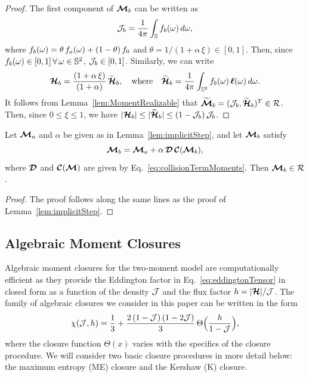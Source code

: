 \begin{proof}
  The first component of $\boldsymbol{\mathcal{M}}_{b}$ can be written as
  \begin{equation}
    \mathcal{J}_{b}=\frac{1}{4\pi}\int_{\mathbb{S}}f_{b}(\omega)\,d\omega,
  \end{equation}
  where $f_{b}(\omega)=\theta\,f_{a}(\omega)+(1-\theta)\,f_{0}$ and $\theta=1/(1+\alpha\,\xi)\in[0,1]$.  
  Then, since $f_{b}(\omega)\in[0,1]\,\forall\,\omega\in\mathbb{S}^{2}$, $\mathcal{J}_{b}\in[0,1]$.  
  Similarly, we can write
  \begin{equation*}
    \boldsymbol{\mathcal{H}}_{b}=\frac{(1+\alpha\,\xi)}{(1+\alpha)}\,\widetilde{\boldsymbol{\mathcal{H}}}_{b},
    \quad\text{where}\quad
    \widetilde{\boldsymbol{\mathcal{H}}}_{b}=\frac{1}{4\pi}\int_{\mathbb{S}^{2}}f_{b}(\omega)\,\boldsymbol{\ell}(\omega)\,d\omega.  
  \end{equation*}
  It follows from Lemma~\ref{lem:MomentRealizable} that $\widetilde{\boldsymbol{\boldsymbol{\mathcal{M}}}}_{b}=(\mathcal{J}_{b},\widetilde{\boldsymbol{\mathcal{H}}}_{b})^{T}\in\mathcal{R}$.  
  Then, since $0\le\xi\le1$, we have $|\boldsymbol{\mathcal{H}}_{b}|\le|\widetilde{\boldsymbol{\mathcal{H}}}_{b}|\le(1-\mathcal{J}_{b})\,\mathcal{J}_{b}$.  
\end{proof}

\begin{lemma}
  Let $\boldsymbol{\mathcal{M}}_{a}$ and $\alpha$ be given as in Lemma~\ref{lem:implicitStep}, and let $\boldsymbol{\mathcal{M}}_{b}$ satisfy
  \begin{equation*}
    \boldsymbol{\mathcal{M}}_{b}=\boldsymbol{\mathcal{M}}_{a}+\alpha\,\boldsymbol{\mathcal{D}}\,\boldsymbol{\mathcal{C}}(\boldsymbol{\mathcal{M}}_{b}),    
  \end{equation*}
  where $\boldsymbol{\mathcal{D}}$ and $\boldsymbol{\mathcal{C}}(\boldsymbol{\mathcal{M}})$ are given by Eq.~\eqref{eq:collisionTermMoments}.  
  Then $\boldsymbol{\mathcal{M}}_{b}\in\mathcal{R}$.  
  \label{lem:correctionStep}
\end{lemma}

\begin{proof}
  The proof follows along the same lines as the proof of Lemma~\ref{lem:implicitStep}.  
\end{proof}


\subsection{Algebraic Moment Closures}

Algebraic moment closures for the two-moment model are computationally efficient as they provide the Eddington factor in Eq.~\eqref{eq:eddingtonTensor} in closed form as a function of the density $\mathcal{J}$ and the flux factor $h=|\boldsymbol{\mathcal{H}}|/\mathcal{J}$.  
The family of algebraic closures we consider in this paper can be written in the form \cite{cernohorskyBludman_1994}
\begin{equation}
  \chi(\mathcal{J},h)=\frac{1}{3}+\frac{2\,(1-\mathcal{J})\,(1-2\mathcal{J})}{3}\,\Theta\Big(\frac{h}{1-\mathcal{J}}\Big),
  \label{eq:eddingtonFactor}
\end{equation}
where the closure function $\Theta(x)$ varies with the specifics of the closure procedure.  
We will consider two basic closure procedures in more detail below: the maximum entropy (ME) closure and the Kershaw (K) closure.  


